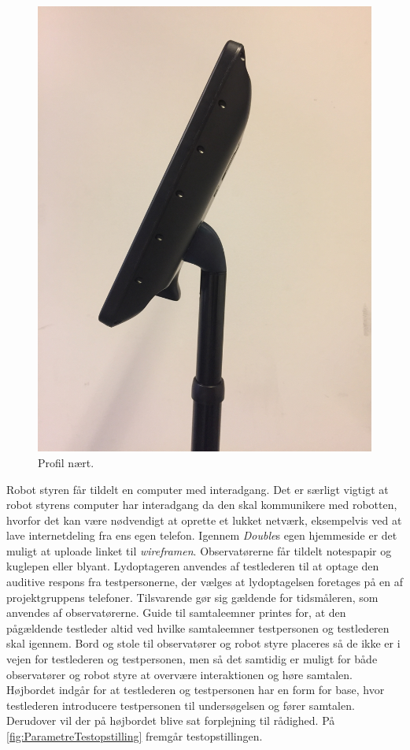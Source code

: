 \begin{figure}[H]
\begin{minipage}{.33\textwidth}
  \includegraphics[width=\linewidth, angle =-90]{Figure/ModificeretDoubleSideClose}
  \caption{Profil nært.}
  \label{fig:ModificeretDoubleSideClose}
\end{minipage}
\end{figure}
\noindent
%
Robot styren får tildelt en computer med interadgang. Det er særligt vigtigt at robot styrens computer har interadgang da den skal kommunikere med robotten, hvorfor det kan være nødvendigt at oprette et lukket netværk, eksempelvis ved at lave internetdeling fra ens egen telefon. Igennem \textit{Double}s egen hjemmeside er det muligt at uploade linket til \textit{wireframen}. Observatørerne får tildelt notespapir og kuglepen eller blyant. Lydoptageren anvendes af testlederen til at optage den auditive respons fra testpersonerne, der vælges at lydoptagelsen foretages på en af projektgruppens telefoner. Tilsvarende gør sig gældende for tidsmåleren, som anvendes af observatørerne. Guide til samtaleemner printes for, at den pågældende testleder altid ved hvilke samtaleemner testpersonen og testlederen skal igennem. Bord og stole til observatører og robot styre placeres så de ikke er i vejen for testlederen og testpersonen, men så det samtidig er muligt for både observatører og robot styre at overvære interaktionen og høre samtalen. Højbordet indgår for at testlederen og testpersonen har en form for base, hvor testlederen introducere testpersonen til undersøgelsen og fører samtalen. Derudover vil der på højbordet blive sat forplejning til rådighed. På \autoref{fig:ParametreTestopstilling} fremgår testopstillingen.   
